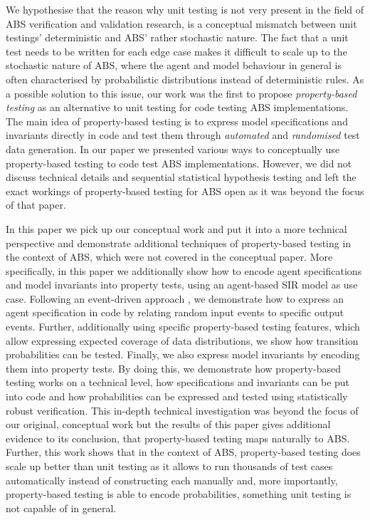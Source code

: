 We hypothesise that the reason why unit testing is not very present in the field of ABS verification and validation research, is a conceptual mismatch between unit testings' deterministic and ABS' rather stochastic nature. The fact that a unit test needs to be written for each edge case makes it difficult to scale up to the stochastic nature of ABS, where the agent and model behaviour in general is often characterised by probabilistic distributions instead of deterministic rules. As a possible solution to this issue, our work \cite{thaler_show_2019} was the first to propose \textit{property-based testing} as an alternative to unit testing for code testing ABS implementations. The main idea of property-based testing is to express model specifications and invariants directly in code and test them through \textit{automated} and \textit{randomised} test data generation. In our paper \cite{thaler_show_2019} we presented various ways to conceptually use property-based testing to code test ABS implementations. However, we did not discuss technical details and sequential statistical hypothesis testing and left the exact workings of property-based testing for ABS open as it was beyond the focus of that paper.

In this paper we pick up our conceptual work \cite{thaler_show_2019} and put it into a more technical perspective and demonstrate additional techniques of property-based testing in the context of ABS, which were not covered in the conceptual paper. More specifically, in this paper we additionally show how to encode agent specifications and model invariants into property tests, using an agent-based SIR model \cite{macal_agent-based_2010} as use case. Following an event-driven approach \cite{meyer_event-driven_2014}, we demonstrate how to express an agent specification in code by relating random input events to specific output events. Further, additionally using specific property-based testing features, which allow expressing expected coverage of data distributions, we show how transition probabilities can be tested. Finally, we also express model invariants by encoding them into property tests. By doing this, we demonstrate how property-based testing works on a technical level, how specifications and invariants can be put into code and how probabilities can be expressed and tested using statistically robust verification. This in-depth technical investigation was beyond the focus of our original, conceptual work \cite{thaler_show_2019} but the results of this paper gives additional evidence to its conclusion, that property-based testing maps naturally to ABS. Further, this work shows that in the context of ABS, property-based testing does scale up better than unit testing as it allows to run thousands of test cases automatically instead of constructing each manually and, more importantly, property-based testing is able to encode probabilities, something unit testing is not capable of in general.


